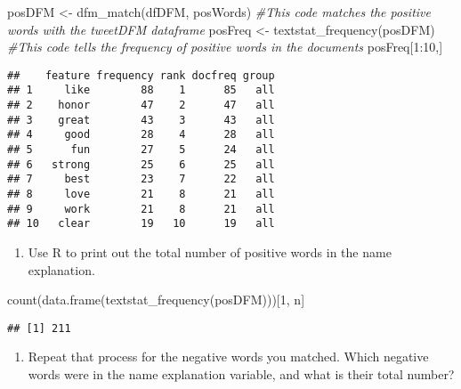 \documentclass[
]{article}
\newenvironment{Shaded}{\begin{snugshade}}{\end{snugshade}}
\newcommand{\CommentTok}[1]{\textcolor[rgb]{0.56,0.35,0.01}{\textit{#1}}}
\newcommand{\DecValTok}[1]{\textcolor[rgb]{0.00,0.00,0.81}{#1}}
\newcommand{\FunctionTok}[1]{\textcolor[rgb]{0.00,0.00,0.00}{#1}}
\newcommand{\NormalTok}[1]{#1}
\newcommand{\OtherTok}[1]{\textcolor[rgb]{0.56,0.35,0.01}{#1}}
\newcommand{\SpecialCharTok}[1]{\textcolor[rgb]{0.00,0.00,0.00}{#1}}
\newcommand{\StringTok}[1]{\textcolor[rgb]{0.31,0.60,0.02}{#1}}
\providecommand{\tightlist}{%
  \setlength{\itemsep}{0pt}\setlength{\parskip}{0pt}}
\begin{document}
\begin{Shaded}
\begin{Highlighting}[]
\NormalTok{posDFM }\OtherTok{\textless{}{-}} \FunctionTok{dfm\_match}\NormalTok{(dfDFM, posWords) }
\CommentTok{\#This code matches the positive words with the tweetDFM dataframe}
\NormalTok{posFreq }\OtherTok{\textless{}{-}} \FunctionTok{textstat\_frequency}\NormalTok{(posDFM)}
\CommentTok{\#This code tells the frequency of positive words in the documents}
\NormalTok{posFreq[}\DecValTok{1}\SpecialCharTok{:}\DecValTok{10}\NormalTok{,]}
\end{Highlighting}
\end{Shaded}

\begin{verbatim}
##    feature frequency rank docfreq group
## 1     like        88    1      85   all
## 2    honor        47    2      47   all
## 3    great        43    3      43   all
## 4     good        28    4      28   all
## 5      fun        27    5      24   all
## 6   strong        25    6      25   all
## 7     best        23    7      22   all
## 8     love        21    8      21   all
## 9     work        21    8      21   all
## 10   clear        19   10      19   all
\end{verbatim}

\begin{enumerate}
\def\labelenumi{\Alph{enumi}.}
\setcounter{enumi}{12}
\tightlist
\item
  Use R to print out the total number of positive words in the name
  explanation.
\end{enumerate}

\begin{Shaded}
\begin{Highlighting}[]
\FunctionTok{count}\NormalTok{(}\FunctionTok{data.frame}\NormalTok{(}\FunctionTok{textstat\_frequency}\NormalTok{(posDFM)))[}\DecValTok{1}\NormalTok{, }\StringTok{\textquotesingle{}n\textquotesingle{}}\NormalTok{]}
\end{Highlighting}
\end{Shaded}

\begin{verbatim}
## [1] 211
\end{verbatim}

\begin{enumerate}
\def\labelenumi{\Alph{enumi}.}
\setcounter{enumi}{13}
\tightlist
\item
  Repeat that process for the negative words you matched. Which negative
  words were in the name explanation variable, and what is their total
  number?
\end{enumerate}
\end{document}
